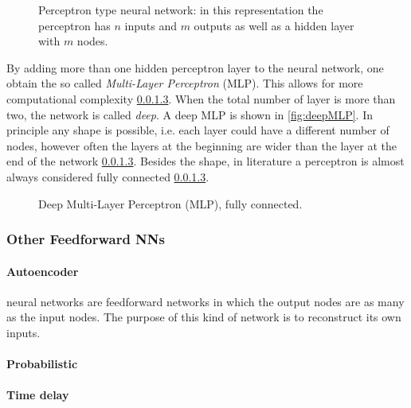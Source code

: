 \begin{figure}[ht]
	\centering
	
	\caption{%
		Perceptron type neural network: in this representation the perceptron has $n$ inputs and $m$ outputs as well as a hidden layer with $m$ nodes. %
		}
	\label{fig:Perceptron}
\end{figure}

By adding more than one hidden perceptron layer to the neural network, one obtain the so called \textit{Multi-Layer Perceptron} (MLP).
This allows for more computational complexity \ref{}.
When the total number of layer is more than two, the network is called \textit{deep}.
A deep MLP is shown in \autoref{fig:deepMLP}.
In principle any shape is possible, i.e. each layer could have a different number of nodes, however often the layers at the beginning are wider than the layer at the end of the network \ref{}.
Besides the shape, in literature a perceptron is almost always considered fully connected \ref{}.

\begin{figure}[ht]
	\centering
	
	\caption{	Deep Multi-Layer Perceptron (MLP), fully connected.}
	\label{fig:deepMLP}
\end{figure}

\subsubsection{Other Feedforward NNs}
\label{sssec:Other_Feedforward_NNs}

\paragraph{Autoencoder} neural networks are feedforward networks in which the output nodes are as many as the input nodes.
The purpose of this kind of network is to reconstruct its own inputs.

\paragraph{Probabilistic}

\paragraph{Time delay}

